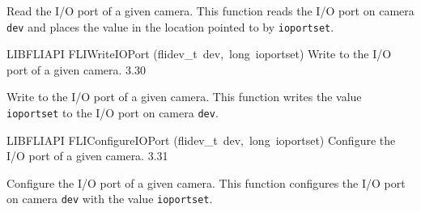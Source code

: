 \documentclass{article}
\begin{document}
\begin{cxxentry}
\begin{cxxfunction}
\begin{cxxdoc}
Read the I/O port of a given camera.  This function reads the I/O
port on camera \texttt{dev} and places the value in the location
pointed to by \texttt{ioportset}.


\end{cxxdoc}
\end{cxxfunction}
\begin{cxxfunction}
{LIBFLIAPI}
        {FLIWriteIOPort}
        {(flidev\_t\ dev,\ long\ ioportset)}
        { Write to the I/O port of a given camera.}
        {3.30}
\begin{cxxdoc}

Write to the I/O port of a given camera.  This function writes the
value \texttt{ioportset} to the I/O port on camera \texttt{dev}.


\end{cxxdoc}
\end{cxxfunction}
\begin{cxxfunction}
{LIBFLIAPI}
        {FLIConfigureIOPort}
        {(flidev\_t\ dev,\ long\ ioportset)}
        { Configure the I/O port of a given camera.}
        {3.31}
\begin{cxxdoc}

Configure the I/O port of a given camera.  This function configures
the I/O port on camera \texttt{dev} with the value
\texttt{ioportset}.


\end{cxxdoc}
\end{cxxfunction}
\end{cxxentry}
\end{document}
